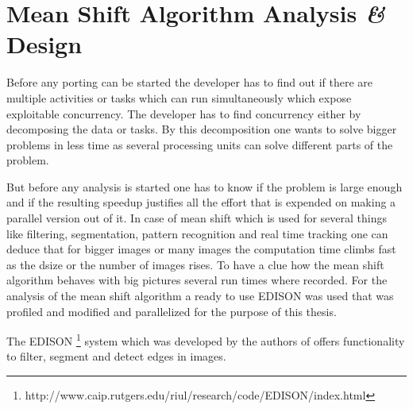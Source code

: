 \chapter{Mean Shift Algorithm Analysis \textit{\&} Design} %
\label{ch:algorithm_analysis}
Before any porting can be started the developer has to find out if there are
multiple activities or tasks which can run simultaneously which expose
exploitable concurrency. The developer has to find concurrency either by
decomposing the data or tasks. By this decomposition one wants to solve bigger
problems in less time as several processing units can solve different parts of
the problem.

But before any analysis is started one has to know if the problem is large
enough and if the resulting speedup justifies all the effort that is expended on
making a parallel version out of it. In case of mean shift which is used for
several things like filtering, segmentation, pattern recognition and real time
tracking one can deduce that for bigger images or many images the computation
time climbs fast as the dsize or the number of images rises. To have a clue how
the mean shift algorithm behaves with big pictures several run times where
recorded. For the analysis of the mean shift algorithm a ready to use
\gls{EDISON} was used that was profiled and modified and parallelized for the
purpose of this thesis.

The \gls{EDISON}
\footnote{http://www.caip.rutgers.edu/riul/research/code/EDISON/index.html}
system which was developed by the authors
\citeauthor{citeulike:462300} of \citep{citeulike:462300} offers
functionality to filter, segment and detect edges in images.
 
